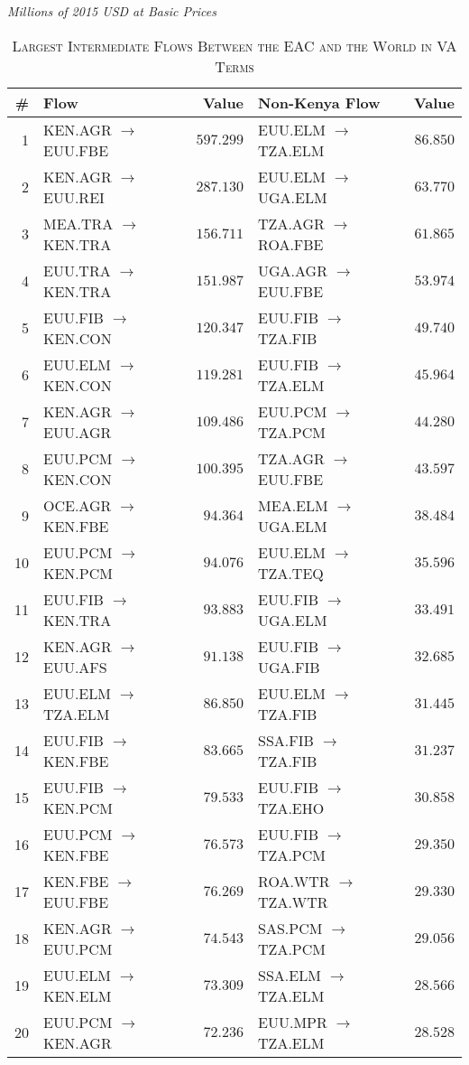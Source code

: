 \documentclass[a4paper]{article}
\begin{document}
\begin{table}[!htbp] \centering 
  \caption{\textsc{Largest Intermediate Flows Between the EAC and the World in VA Terms}} 
  \small{\textit{Millions of 2015 USD at Basic Prices}}
  \label{tab:VAweaclfl} 
  \vspace{2mm}
\begin{tabular}{rlrlr} \toprule
\textbf{\#} & \textbf{Flow} & \textbf{Value} & \textbf{Non-Kenya Flow} & \textbf{Value} \\ 
\midrule
1 & KEN.AGR $\to$  EUU.FBE & $597.299$ & EUU.ELM $\to$  TZA.ELM & $86.850$ \\ 
2 & KEN.AGR $\to$  EUU.REI & $287.130$ & EUU.ELM $\to$  UGA.ELM & $63.770$ \\ 
3 & MEA.TRA $\to$  KEN.TRA & $156.711$ & TZA.AGR $\to$  ROA.FBE & $61.865$ \\ 
4 & EUU.TRA $\to$  KEN.TRA & $151.987$ & UGA.AGR $\to$  EUU.FBE & $53.974$ \\ 
5 & EUU.FIB $\to$  KEN.CON & $120.347$ & EUU.FIB $\to$  TZA.FIB & $49.740$ \\ 
6 & EUU.ELM $\to$  KEN.CON & $119.281$ & EUU.FIB $\to$  TZA.ELM & $45.964$ \\ 
7 & KEN.AGR $\to$  EUU.AGR & $109.486$ & EUU.PCM $\to$  TZA.PCM & $44.280$ \\ 
8 & EUU.PCM $\to$  KEN.CON & $100.395$ & TZA.AGR $\to$  EUU.FBE & $43.597$ \\ 
9 & OCE.AGR $\to$  KEN.FBE & $94.364$ & MEA.ELM $\to$  UGA.ELM & $38.484$ \\ 
10 & EUU.PCM $\to$  KEN.PCM & $94.076$ & EUU.ELM $\to$  TZA.TEQ & $35.596$ \\ 
11 & EUU.FIB $\to$  KEN.TRA & $93.883$ & EUU.FIB $\to$  UGA.ELM & $33.491$ \\ 
12 & KEN.AGR $\to$  EUU.AFS & $91.138$ & EUU.FIB $\to$  UGA.FIB & $32.685$ \\ 
13 & EUU.ELM $\to$  TZA.ELM & $86.850$ & EUU.ELM $\to$  TZA.FIB & $31.445$ \\ 
14 & EUU.FIB $\to$  KEN.FBE & $83.665$ & SSA.FIB $\to$  TZA.FIB & $31.237$ \\ 
15 & EUU.FIB $\to$  KEN.PCM & $79.533$ & EUU.FIB $\to$  TZA.EHO & $30.858$ \\ 
16 & EUU.PCM $\to$  KEN.FBE & $76.573$ & EUU.FIB $\to$  TZA.PCM & $29.350$ \\ 
17 & KEN.FBE $\to$  EUU.FBE & $76.269$ & ROA.WTR $\to$  TZA.WTR & $29.330$ \\ 
18 & KEN.AGR $\to$  EUU.PCM & $74.543$ & SAS.PCM $\to$  TZA.PCM & $29.056$ \\ 
19 & EUU.ELM $\to$  KEN.ELM & $73.309$ & SSA.ELM $\to$  TZA.ELM & $28.566$ \\ 
20 & EUU.PCM $\to$  KEN.AGR & $72.236$ & EUU.MPR $\to$  TZA.ELM & $28.528$ \\ 
\bottomrule
\end{tabular} 
\end{table} 
\FloatBarrier
\end{document}
